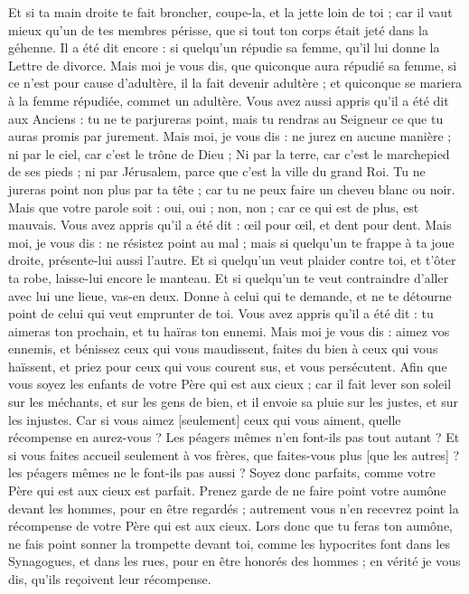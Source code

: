 \begin{multicols}{2}
Et si ta main droite te fait broncher, coupe-la, et la jette loin de toi ; car il vaut mieux qu'un de tes membres périsse, que si tout ton corps était jeté dans la géhenne.
Il a été dit encore : si quelqu'un répudie sa femme, qu'il lui donne la Lettre de divorce.
Mais moi je vous dis, que quiconque aura répudié sa femme, si ce n'est pour cause d'adultère, il la fait devenir adultère ; et quiconque se mariera à la femme répudiée, commet un adultère.
Vous avez aussi appris qu'il a été dit aux Anciens : tu ne te parjureras point, mais tu rendras au Seigneur ce que tu auras promis par jurement.
Mais moi, je vous dis : ne jurez en aucune manière ; ni par le ciel, car c'est le trône de Dieu ;
Ni par la terre, car c'est le marchepied de ses pieds ; ni par Jérusalem, parce que c'est la ville du grand Roi.
Tu ne jureras point non plus par ta tête ; car tu ne peux faire un cheveu blanc ou noir.
Mais que votre parole soit : oui, oui ; non, non ; car ce qui est de plus, est mauvais.
Vous avez appris qu'il a été dit : œil pour œil, et dent pour dent.
Mais moi, je vous dis : ne résistez point au mal ; mais si quelqu'un te frappe à ta joue droite, présente-lui aussi l'autre.
Et si quelqu'un veut plaider contre toi, et t'ôter ta robe, laisse-lui encore le manteau.
Et si quelqu'un te veut contraindre d'aller avec lui une lieue, vas-en deux.
Donne à celui qui te demande, et ne te détourne point de celui qui veut emprunter de toi.
Vous avez appris qu'il a été dit : tu aimeras ton prochain, et tu haïras ton ennemi.
Mais moi je vous dis : aimez vos ennemis, et bénissez ceux qui vous maudissent, faites du bien à ceux qui vous haïssent, et priez pour ceux qui vous courent sus, et vous persécutent.
Afin que vous soyez les enfants de votre Père qui est aux cieux ; car il fait lever son soleil sur les méchants, et sur les gens de bien, et il envoie sa pluie sur les justes, et sur les injustes.
Car si vous aimez [seulement] ceux qui vous aiment, quelle récompense en aurez-vous ? Les péagers mêmes n'en font-ils pas tout autant ?
Et si vous faites accueil seulement à vos frères, que faites-vous plus [que les autres] ? les péagers mêmes ne le font-ils pas aussi ?
Soyez donc parfaits, comme votre Père qui est aux cieux est parfait.
\VerseOne{}Prenez garde de ne faire point votre aumône devant les hommes, pour en être regardés ; autrement vous n'en recevrez point la récompense de votre Père qui est aux cieux.
Lors donc que tu feras ton aumône, ne fais point sonner la trompette devant toi, comme les hypocrites font dans les Synagogues, et dans les rues, pour en être honorés des hommes ; en vérité je vous dis, qu'ils reçoivent leur récompense.

\end{multicols}
